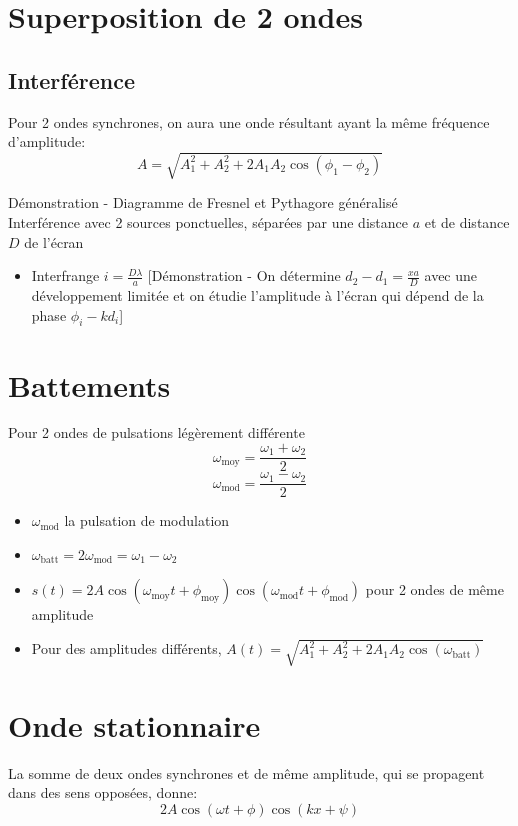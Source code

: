 \documentclass[openany]{book}
\begin{document}
\section{Superposition de 2 ondes}

\subsection{Interférence}
Pour 2 ondes synchrones, on aura une onde résultant ayant la même fréquence d'amplitude:
\[ A = \sqrt{A_1^2 + A_2^2 + 2A_1A_2\cos{(\phi_1 - \phi_2)}} \]

\noindent Démonstration - Diagramme de Fresnel et Pythagore généralisé \\

\noindent Interférence avec 2 sources ponctuelles, séparées par une distance $a$ et de distance $D$ de l'écran
\begin{itemize}
    \item Interfrange $ i = \frac{D\lambda}{a} $ [Démonstration - On détermine $d_2 - d_1 = \frac{xa}{D}$ avec une développement limitée et on étudie l'amplitude à l'écran qui dépend de la phase $\phi_i - k d_i$]
\end{itemize} 
\noindent 

\section{Battements}
Pour 2 ondes de pulsations légèrement différente
\[ \omega_{\text{moy}} = \frac{\omega_1+\omega_2}{2} \]
\[ \omega_{\text{mod}} = \frac{\omega_1-\omega_2}{2} \]

\begin{itemize}
    \item $\omega_{\text{mod}}$ la pulsation de modulation
    \item $\omega_{\text{batt}} = 2\omega_{\text{mod}} = \omega_1-\omega_2$
    \item $ s(t) = 2A\cos{(\omega_{\text{moy}} t + \phi_{\text{moy}})}\cos{(\omega_{\text{mod}} t + \phi_{\text{mod}})} $ pour 2 ondes de même amplitude
    \item Pour des amplitudes différents, $A(t) = \sqrt{A_1^2 + A_2^2 + 2A_1A_2\cos{(\omega_{\text{batt}})}}$
\end{itemize}

\section{Onde stationnaire}
La somme de deux ondes synchrones et de même amplitude, qui se propagent dans des sens opposées, donne:
\[ 2A \cos{(\omega t + \phi)} \cos{(kx + \psi)} \]
\end{document}
